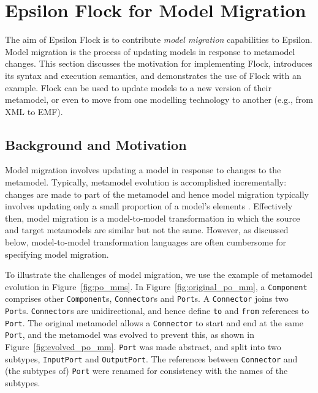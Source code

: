 
\chapter{Epsilon Flock for Model Migration}
\label{sec:Flock}

The aim of Epsilon Flock is to contribute \emph{model migration} capabilities to Epsilon. Model migration is the process of updating models in response to metamodel changes. This section discusses the motivation for implementing Flock, introduces its syntax and execution semantics, and demonstrates the use of Flock with an example.
Flock can be used to update models to a new version of their metamodel, or even to move from one modelling technology to another (e.g., from XML to EMF).

\section{Background and Motivation}
\label{sec:flock_background}
Model migration involves updating a model in response to changes to the metamodel. Typically, metamodel evolution is accomplished incrementally: changes are made to part of the metamodel and hence model migration typically involves updating only a small proportion of a model's elements \cite{sprinkle03thesis,herrmannsdoerfer08automatability}. Effectively then, model migration is a model-to-model transformation in which the source and target metamodels are similar but not the same. However, as discussed below, model-to-model transformation languages are often cumbersome for specifying model migration.

To illustrate the challenges of model migration, we use the example of metamodel evolution in Figure~\ref{fig:po_mms}. In Figure~\ref{fig:original_po_mm}, a \texttt{Co\-mp\-on\-e\-nt} comprises other \texttt{Co\-mp\-on\-e\-nt}s, \texttt{Co\-nn\-ec\-t\-or}s and \texttt{Po\-rt}s. A \texttt{Co\-nn\-ec\-t\-or} joins two \texttt{Po\-rt}s. \texttt{Co\-nn\-ec\-t\-or}s are unidirectional, and hence define \texttt{to} and \texttt{fr\-om} references to \texttt{Po\-rt}. The original metamodel allows a \texttt{Co\-nn\-ec\-t\-or} to start and end at the same \texttt{Po\-rt}, and the metamodel was evolved to prevent this, as shown in Figure~\ref{fig:evolved_po_mm}. \texttt{Po\-rt} was made abstract, and split into two subtypes, \texttt{In\-p\-utPo\-rt} and \texttt{Ou\-t\-putPo\-rt}. The references between \texttt{Co\-nn\-ec\-t\-or} and (the subtypes of) \texttt{Po\-rt} were renamed for consistency with the names of the subtypes.

